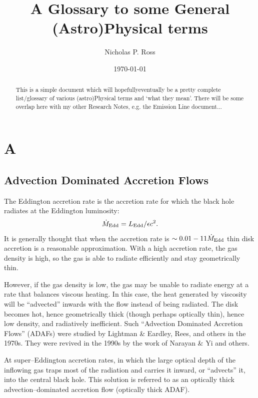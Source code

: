 \documentclass[11pt]{article}
\begin{document}
\title{A Glossary to some General (Astro)Physical terms}
\author{Nicholas P. Ross}
\date{\today}
\maketitle


\begin{abstract}
This is a simple document which will hopefully\/eventually be a pretty
complete list/glossary of various (astro)Physical terms and `what they
mean'. There will be some overlap here with my other Research Notes,
e.g. the Emission Line document...
\end{abstract}



\section*{A}
\subsection*{Advection Dominated Accretion Flows}
The Eddington accretion rate is the accretion rate for which the black
hole radiates at the Eddington luminosity:
\begin{equation} 
    \dot{M}_{\rm Edd} = L_{\rm Edd} /\epsilon c^{2}.
\end{equation} 
It is generally thought that when the accretion rate is $\sim0.01-11
\dot{M}_{\rm Edd}$ thin disk accretion is a reasonable approximation.
With a high accretion rate, the gas density is high, so the gas is
able to radiate efficiently and stay geometrically thin.

However, if the gas density is low, the gas may be unable to radiate
energy at a rate that balances viscous heating.  In this case, the
heat generated by viscosity will be ``advected'' inwards with the flow
instead of being radiated. The disk becomes hot, hence geometrically
thick (though perhaps optically thin), hence low density, and
radiatively inefficient.  Such ``Advection Dominated Accretion Flows''
(ADAFs) were studied by Lightman \& Eardley, Rees, and others in the
1970s. They were revived in the 1990s by the work of Narayan \& Yi and
others.

At super–Eddington accretion rates, in which the large optical depth
of the inflowing gas traps most of the radiation and carries it
inward, or “advects” it, into the central black hole. This solution is
referred to as an optically thick advection–dominated accretion flow
(optically thick ADAF).
\end{document}

